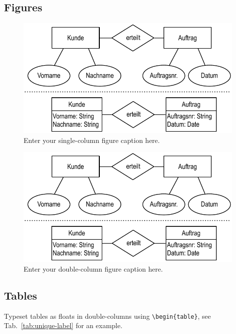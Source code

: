 \documentclass[british]{emisa}
\begin{document}
\begin{article}
\subsection{Figures}\label{sec:3}
\begin{figure}[htbp]
\centering
\includegraphics[width=\columnwidth]{figure.pdf}
\caption{Enter your single-column figure caption here.}
\label{default}
\end{figure}

\begin{figure}[htb]
\centering
\includegraphics[width=\textwidth]{figure.pdf}
\caption{Enter your double-column figure caption here.}
\label{default}
\end{figure}

\blindtext



\subsection{Tables}\label{sec:tables}
Typeset tables as floats in double-columns using \verb|\begin{table}|, see Tab.~\ref{tab:unique-label} for an example.


\end{article}
\end{document}
